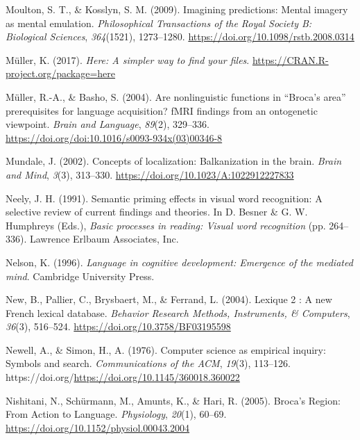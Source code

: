 \documentclass[
  a4paper,12pt,twoside,onecolumn,openright,final,oldfontcommands]{memoir}
\newlength{\cslhangindent}
\newlength{\cslentryspacingunit} %
\newenvironment{CSLReferences}[2] %
 {%
  \setlength{\parindent}{0pt}
  \ifodd #1
  \let\oldpar\par
  \def\par{\hangindent=\cslhangindent\oldpar}
  \fi
  \setlength{\parskip}{#2\cslentryspacingunit}
 }%
 {}
\begin{document}
\begin{CSLReferences}{1}{0}
\leavevmode{}%
Moulton, S. T., \& Kosslyn, S. M. (2009). Imagining predictions: Mental imagery as mental emulation. \emph{Philosophical Transactions of the Royal Society B: Biological Sciences}, \emph{364}(1521), 1273--1280. \url{https://doi.org/10.1098/rstb.2008.0314}

\leavevmode{}%
Müller, K. (2017). \emph{Here: A simpler way to find your files}. \url{https://CRAN.R-project.org/package=here}

\leavevmode{}%
Müller, R.-A., \& Basho, S. (2004). Are nonlinguistic functions in {``{Broca}'s area''} prerequisites for language acquisition? {fMRI} findings from an ontogenetic viewpoint. \emph{Brain and Language}, \emph{89}(2), 329--336. \url{https://doi.org/doi:10.1016/s0093-934x(03)00346-8}

\leavevmode{}%
Mundale, J. (2002). Concepts of localization: {Balkanization} in the brain. \emph{Brain and Mind}, \emph{3}(3), 313--330. \url{https://doi.org/10.1023/A:1022912227833}

\leavevmode{}%
Neely, J. H. (1991). Semantic priming effects in visual word recognition: {A} selective review of current findings and theories. In D. Besner \& G. W. Humphreys (Eds.), \emph{Basic processes in reading: {Visual} word recognition} (pp. 264--336). Lawrence Erlbaum Associates, Inc.

\leavevmode{}%
Nelson, K. (1996). \emph{Language in cognitive development: Emergence of the mediated mind}. Cambridge University Press.

\leavevmode{}%
New, B., Pallier, C., Brysbaert, M., \& Ferrand, L. (2004). Lexique 2 : {A} new {French} lexical database. \emph{Behavior Research Methods, Instruments, \& Computers}, \emph{36}(3), 516--524. \url{https://doi.org/10.3758/BF03195598}

\leavevmode{}%
Newell, A., \& Simon, H., A. (1976). Computer science as empirical inquiry: {Symbols} and search. \emph{Communications of the ACM}, \emph{19}(3), 113--126. https://doi.org/\url{https://doi.org/10.1145/360018.360022}

\leavevmode{}%
Nishitani, N., Schürmann, M., Amunts, K., \& Hari, R. (2005). Broca's {Region}: {From} {Action} to {Language}. \emph{Physiology}, \emph{20}(1), 60--69. \url{https://doi.org/10.1152/physiol.00043.2004}


\end{CSLReferences}
\end{document}
